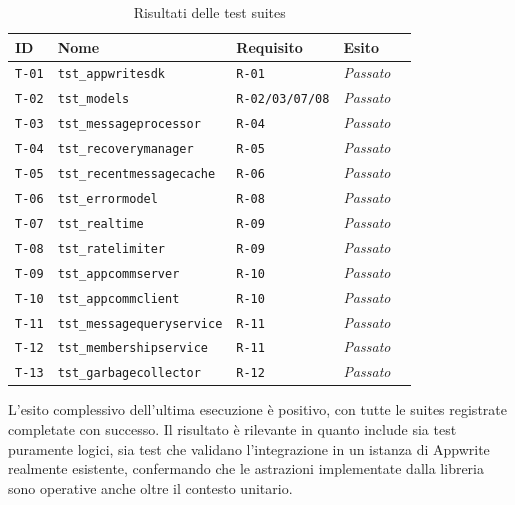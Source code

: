 \documentclass[a4paper, 11pt, twoside]{report}
\begin{document}
\begin{table}[h]
\centering
\begin{tabular}{@{}lp{8cm}lll@{}}
\toprule
\textbf{ID}   & \textbf{Nome}                     & \textbf{Requisito}     & \textbf{Esito}   \\ \midrule
\texttt{T-01} & \texttt{tst\_appwritesdk}         & \texttt{R-01}          & \color{ForestGreen}\textit{Passato} \\
\texttt{T-02} & \texttt{tst\_models}              & \texttt{R-02/03/07/08} & \color{ForestGreen}\textit{Passato} \\
\texttt{T-03} & \texttt{tst\_messageprocessor}    & \texttt{R-04}          & \color{ForestGreen}\textit{Passato} \\
\texttt{T-04} & \texttt{tst\_recoverymanager}     & \texttt{R-05}          & \color{ForestGreen}\textit{Passato} \\
\texttt{T-05} & \texttt{tst\_recentmessagecache}  & \texttt{R-06}          & \color{ForestGreen}\textit{Passato} \\
\texttt{T-06} & \texttt{tst\_errormodel}          & \texttt{R-08}          & \color{ForestGreen}\textit{Passato} \\
\texttt{T-07} & \texttt{tst\_realtime}            & \texttt{R-09}          & \color{ForestGreen}\textit{Passato} \\
\texttt{T-08} & \texttt{tst\_ratelimiter}         & \texttt{R-09}          & \color{ForestGreen}\textit{Passato} \\
\texttt{T-09} & \texttt{tst\_appcommserver}       & \texttt{R-10}          & \color{ForestGreen}\textit{Passato} \\
\texttt{T-10} & \texttt{tst\_appcommclient}       & \texttt{R-10}          & \color{ForestGreen}\textit{Passato} \\
\texttt{T-11} & \texttt{tst\_messagequeryservice} & \texttt{R-11}          & \color{ForestGreen}\textit{Passato} \\
\texttt{T-12} & \texttt{tst\_membershipservice}   & \texttt{R-11}          & \color{ForestGreen}\textit{Passato} \\
\texttt{T-13} & \texttt{tst\_garbagecollector}    & \texttt{R-12}          & \color{ForestGreen}\textit{Passato} \\
\bottomrule
\end{tabular}
\caption{Risultati delle test suites}
\end{table}

L'esito complessivo dell'ultima esecuzione è positivo, con tutte le suites registrate completate con successo.
Il risultato è rilevante in quanto include sia test puramente logici, sia test che validano l'integrazione in un istanza di Appwrite
realmente esistente, confermando che le astrazioni implementate dalla libreria sono operative anche oltre il contesto unitario.
\end{document}
